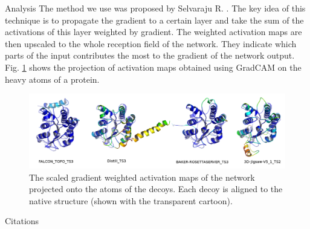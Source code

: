 \documentclass[final, unknownkeysallowed]{beamer}
\begin{document}
\begin{frame}{}
\begin{textblock}{39.0}
\begin{block}{Analysis}
The method we use was proposed 
by Selvaraju R. \cite{selvaraju2016grad}. The key idea of this technique is to propagate the gradient to a certain layer and take the sum of the 
activations of this layer weighted by gradient. The weighted activation maps are then upscaled to the whole reception field of the network.
They indicate which parts of the input contributes the most to the gradient of the network output. Fig. \ref{Fig:GradCAMT0776_more} shows 
the projection of activation maps obtained using GradCAM on the heavy atoms of a protein.

\begin{figure}[H]
    \centering
    \includegraphics[width=\linewidth]{../draft/Fig/T0776.png}
    \caption{The scaled gradient weighted activation maps of the network projected onto the atoms of the decoys. 
    Each decoy is aligned to the native structure (shown with the transparent cartoon).}
    \label{Fig:GradCAMT0776_more}
\end{figure}
\end{block}


\begin{block}{Citations}
{}

\end{block}

\end{textblock}

\end{frame}
\end{document}
